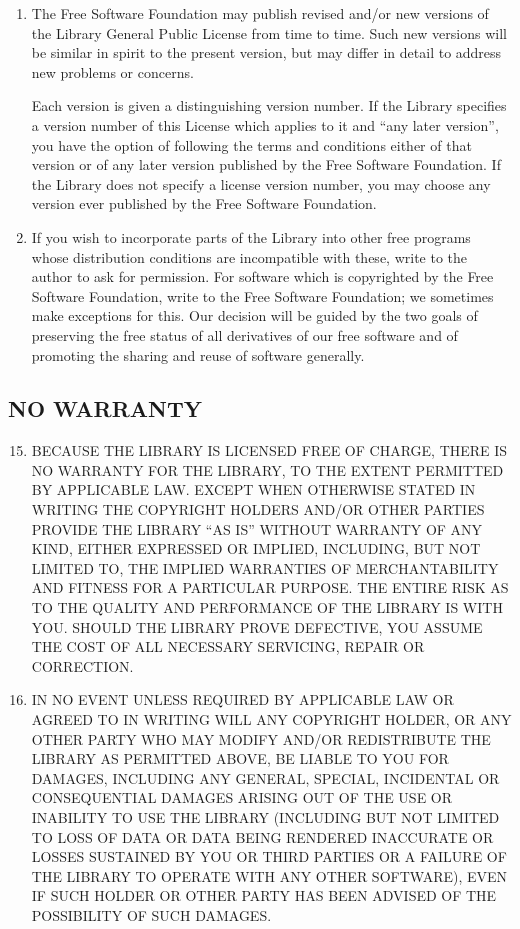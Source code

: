 \begin{enumerate}
\item The Free Software Foundation may publish revised and/or new
versions of the Library General Public License from time to time.
Such new versions will be similar in spirit to the present version,
but may differ in detail to address new problems or concerns.

Each version is given a distinguishing version number.  If the Library
specifies a version number of this License which applies to it and
``any later version'', you have the option of following the terms and
conditions either of that version or of any later version published by
the Free Software Foundation.  If the Library does not specify a
license version number, you may choose any version ever published by
the Free Software Foundation.

\item If you wish to incorporate parts of the Library into other free
programs whose distribution conditions are incompatible with these,
write to the author to ask for permission.  For software which is
copyrighted by the Free Software Foundation, write to the Free
Software Foundation; we sometimes make exceptions for this.  Our
decision will be guided by the two goals of preserving the free status
of all derivatives of our free software and of promoting the sharing
and reuse of software generally.
\end{enumerate}

\subsection*{NO WARRANTY}

\begin{enumerate}
\setcounter{enumi}{14}
\item BECAUSE THE LIBRARY IS LICENSED FREE OF CHARGE, THERE IS NO
WARRANTY FOR THE LIBRARY, TO THE EXTENT PERMITTED BY APPLICABLE LAW\@.
EXCEPT WHEN OTHERWISE STATED IN WRITING THE COPYRIGHT HOLDERS AND/OR
OTHER PARTIES PROVIDE THE LIBRARY ``AS IS'' WITHOUT WARRANTY OF ANY
KIND, EITHER EXPRESSED OR IMPLIED, INCLUDING, BUT NOT LIMITED TO, THE
IMPLIED WARRANTIES OF MERCHANTABILITY AND FITNESS FOR A PARTICULAR
PURPOSE\@.  THE ENTIRE RISK AS TO THE QUALITY AND PERFORMANCE OF THE
LIBRARY IS WITH YOU\@.  SHOULD THE LIBRARY PROVE DEFECTIVE, YOU ASSUME
THE COST OF ALL NECESSARY SERVICING, REPAIR OR CORRECTION.

\item IN NO EVENT UNLESS REQUIRED BY APPLICABLE LAW OR AGREED TO IN
WRITING WILL ANY COPYRIGHT HOLDER, OR ANY OTHER PARTY WHO MAY MODIFY
AND/OR REDISTRIBUTE THE LIBRARY AS PERMITTED ABOVE, BE LIABLE TO YOU
FOR DAMAGES, INCLUDING ANY GENERAL, SPECIAL, INCIDENTAL OR
CONSEQUENTIAL DAMAGES ARISING OUT OF THE USE OR INABILITY TO USE THE
LIBRARY (INCLUDING BUT NOT LIMITED TO LOSS OF DATA OR DATA BEING
RENDERED INACCURATE OR LOSSES SUSTAINED BY YOU OR THIRD PARTIES OR A
FAILURE OF THE LIBRARY TO OPERATE WITH ANY OTHER SOFTWARE), EVEN IF
SUCH HOLDER OR OTHER PARTY HAS BEEN ADVISED OF THE POSSIBILITY OF SUCH
DAMAGES.
\end{enumerate}

